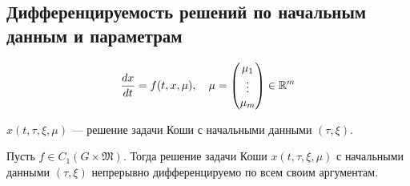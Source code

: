 \subsection{Дифференцируемость решений по начальным данным и параметрам}

$$\frac{dx}{dt} = f(t, x, \mu), \quad \mu = \begin{pmatrix}
  \mu_1 \\
  \vdots \\
  \mu_m
\end{pmatrix} \in \mathbb{R}^m$$

$x(t, \tau, \xi, \mu)$ --- решение задачи Коши с начальными данными $(\tau, \xi)$.

\begin{theorem}
  Пусть $f\in C_1(G \times\mathfrak{M})$. Тогда решение задачи Коши $x(t,\tau, \xi, \mu)$
  с начальными данными $(\tau, \xi)$ непрерывно дифференцируемо по всем своим аргументам.
\end{theorem}

